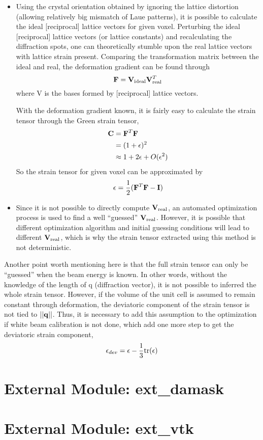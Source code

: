 \documentclass[12pt]{scrartcl}
\begin{document}
\begin{enumerate}
\begin{itemize}
	\item
	Using the crystal orientation obtained by ignoring the lattice distortion (allowing relatively big mismatch of Laue patterns), it is possible to calculate the ideal [reciprocal] lattice vectors for given voxel.
	Perturbing the ideal [reciprocal] lattice vectors (or lattice constants) and recalculating the diffraction spots, one can theoretically stumble upon the real lattice vectors with lattice strain present. 
	Comparing the transformation matrix between the ideal and real, the deformation gradient can be found through
\[
	\mathbf{F} = \mathbf{V}_\text{ideal} \mathbf{V}_\text{real}^T
\]
where \tnsr V is the bases formed by [reciprocal] lattice vectors.
	
	With the deformation gradient known, it is fairly easy to calculate the strain tensor through the Green strain tensor,
\begin{align*}
	\mathbf{C} &= \mathbf{F}^T \mathbf{F} \\
	           &= (1 + \mathbf{\epsilon})^2 \\
	           &\approx 1 + 2 \mathbf{\epsilon} + O(\mathbf{\epsilon}^2)
\end{align*}
	So the strain tensor for given voxel can be approximated by
\[
	\mathbf{\epsilon} = \dfrac{1}{2}(\mathbf{F}^T \mathbf{F} - \mathbf{I})
\]

	\item
	Since it is not possible to directly compute $\mathbf{V}_\text{real}$, an automated optimization process is used to find a well ``guessed'' $\mathbf{V}_\text{real}$.
	However, it is possible that different optimization algorithm and initial guessing conditions will lead to different $\mathbf{V}_\text{real}$, which is why the strain tensor extracted using this method is not deterministic.

	\end{itemize} 
\end{enumerate}

Another point worth mentioning here is that the full strain tensor can only be ``guessed'' when the beam energy is known.
In other words, without the knowledge of the length of \tnsr q (diffraction vector), it is not possible to inferred the whole strain tensor.
However, if the volume of the unit cell is assumed to remain constant through deformation, the deviatoric component of the strain tensor is not tied to $||\mathbf{q}||$.
Thus, it is necessary to add this assumption to the optimization if white beam calibration is not done, which add one more step to get the deviatoric strain component,
\[
	\mathbf{\epsilon}_{dev} = \mathbf{\epsilon} - \dfrac{1}{3}\text{tr}(\mathbf{\epsilon})
\]
\section{External Module: ext\_damask}

\section{External Module: ext\_vtk}
\end{document}
